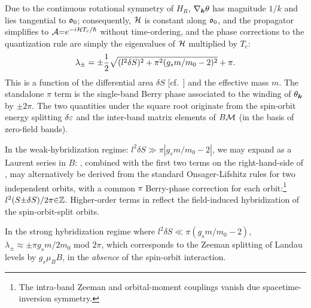 \documentclass[aps, prb, showpacs, twocolumn, notitlepage, superscriptaddress]{revtex4-1}
\begin{document}
Due to the continuous rotational symmetry of $H_R$, $\nabla_{\boldsymbol{k}} \theta$ has magnitude $1/k$ and lies tangential to $\mathfrak{o}_0$; consequently, ${\cal H}$ is constant along $\mathfrak{o}_0$, and the propagator simplifies to ${\cal A}{=}e^{{-}i{\cal H} T_c/\hbar}$ without time-ordering, and the phase corrections to the quantization rule are simply the eigenvalues of ${\cal H}$ multiplied by $T_c$:
\begin{equation}
\lambda_{\pm}=\pm\frac{1}{2}\sqrt{({l^2\delta S})^2+\pi^2(g_sm/m_0-2)^2}+\pi. \label{eq:Rashba-lambda}
\end{equation}
This is a function of the differential area $\delta S$ [cf.\ ] and the effective mass $m$. The standalone $\pi$ term is the single-band Berry phase associated to the winding of $\theta_{\boldsymbol{k}}$ by ${\pm}2\pi$. The two quantities under the square root originate from the spin-orbit energy splitting $\delta \varepsilon$ and the inter-band matrix elements of $B{\cal M}$ (in the basis of zero-field bands). 

In the weak-hybridization regime: $l^2\delta S \gg \pi|g_s m/m_0{-}2|$, we may expand  as a Laurent series in $B$:
, combined with the first two terms on the right-hand-side of , may alternatively be derived from  the standard Onsager-Lifshitz rules for two independent orbits, with a common $\pi$ Berry-phase correction for each orbit:\footnote{The intra-band Zeeman and orbital-moment couplings vanish due spacetime-inversion symmetry\cite{topoferm}.} $l^2(S{\pm}\delta S)/2\pi {\in}\mathbb{Z}$. Higher-order terms in  reflect the field-induced hybridization of the spin-orbit-split orbits. 


In the strong hybridization regime where $l^2\delta S {\ll}\pi(g_sm/m_0{-}2)$, $\lambda_{\pm}{\approx}{\pm}\pi g_sm/2m_0$ mod $2\pi$, which corresponds to the Zeeman splitting of Landau levels by $g_{s}\mu_BB$, in the \textit{absence} of the spin-orbit interaction. 



\end{document}
